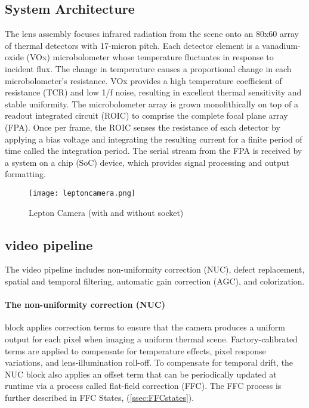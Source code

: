 \subsection{System Architecture}
\label{ssec:leptonarchitecture}
The lens assembly focuses infrared radiation from the scene onto an 80x60 array
of thermal detectors with 17-micron pitch. Each detector element is a
vanadium-oxide (VOx) microbolometer whose temperature fluctuates in response to
incident flux. The change in temperature causes a proportional change in each
microbolometer’s resistance. VOx provides a high temperature coefficient of
resistance (TCR) and low 1/f noise, resulting in excellent thermal sensitivity
and stable uniformity. The microbolometer array is grown monolithically on top
of a readout integrated circuit (ROIC) to comprise the complete focal plane
array (FPA). Once per frame, the ROIC senses the resistance of each detector by
applying a bias voltage and integrating the resulting current for a finite
period of time called the integration period. The serial stream from the FPA is
received by a system on a chip (SoC) device, which provides signal processing
and output formatting.

\begin{figure}[htb]
    \centering
    \texttt{[image: leptoncamera.png]}
    \caption{Lepton Camera (with and without socket)}
    \label{fig:camerarender}
\end{figure}
%
\subsection{video pipeline}
\label{ssec:pipeline}
The video pipeline includes non-uniformity correction (NUC), defect replacement,
spatial and temporal filtering, automatic gain correction (AGC), and
colorization.
%
%
\paragraph{The non-uniformity correction (NUC)} block applies correction
terms to ensure that the camera produces a uniform output for each pixel when
imaging a uniform thermal scene. Factory-calibrated terms are applied to
compensate for temperature effects, pixel response variations, and
lens-illumination roll-off. To compensate for temporal drift, the NUC block also
applies an offset term that can be periodically updated at runtime via a process
called flat-field correction (FFC). The FFC process is further described in FFC
States, (\ref{ssec:FFCstates}).
%
